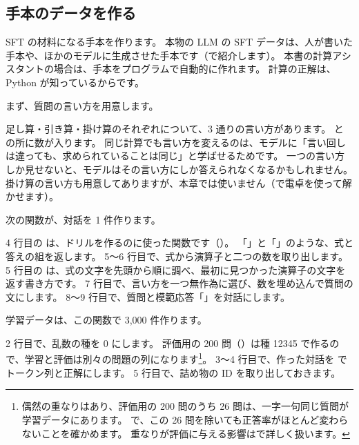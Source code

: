 \subsection{手本のデータを作る}

SFT の材料になる手本を作ります。
本物の LLM の SFT データは、人が書いた手本や、ほかのモデルに生成させた手本です（で紹介します）。
本書の計算アシスタントの場合は、手本をプログラムで自動的に作れます。
計算の正解は、Python が知っているからです。

まず、質問の言い方を用意します。


足し算・引き算・掛け算のそれぞれについて、3 通りの言い方があります。
 と  の所に数が入ります。
同じ計算でも言い方を変えるのは、モデルに「言い回しは違っても、求められていることは同じ」と学ばせるためです。
一つの言い方しか見せないと、モデルはその言い方にしか答えられなくなるかもしれません。
掛け算の言い方も用意してありますが、本章では使いません（で電卓を使って解かせます）。

次の関数が、対話を 1 件作ります。


4 行目の  は、ドリルを作るのに使った関数です（）。
「」と「」のような、式と答えの組を返します。
5〜6 行目で、式から演算子と二つの数を取り出します。
5 行目の  は、式の文字を先頭から順に調べ、最初に見つかった演算子の文字を返す書き方です。
7 行目で、言い方を一つ無作為に選び、数を埋め込んで質問の文にします。
8〜9 行目で、質問と模範応答「」を対話にします。

学習データは、この関数で 3,000 件作ります。


2 行目で、乱数の種を 0 にします。
評価用の 200 問（）は種 12345 で作るので、学習と評価は別々の問題の列になります\footnote{偶然の重なりはあり、評価用の 200 問のうち 26 問は、一字一句同じ質問が学習データにあります。
で、この 26 問を除いても正答率がほとんど変わらないことを確かめます。
重なりが評価に与える影響はで詳しく扱います。}。
3〜4 行目で、作った対話を  でトークン列と正解にします。
5 行目で、詰め物の ID を取り出しておきます。


